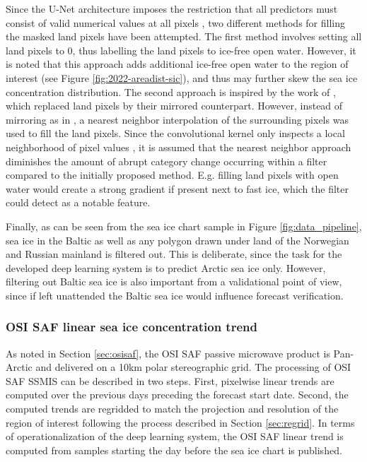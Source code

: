 \documentclass[../main/thesis]{subfiles}
\begin{document}
Since the U-Net architecture imposes the restriction that all predictors must consist of valid numerical values at all pixels \citep{Ronneberger2015}, two different methods for filling the masked land pixels have been attempted. The first method involves setting all land pixels to 0, thus labelling the land pixels to ice-free open water. However, it is noted that this approach adds additional ice-free open water to the region of interest (see Figure \ref{fig:2022-areadist-sic}), and thus may further skew the sea ice concentration distribution. The second approach is inspired by the work of \citet{Wang2017}, which replaced land pixels by their mirrored counterpart. However, instead of mirroring as in \citet{Wang2017}, a nearest neighbor interpolation of the surrounding pixels was used to fill the land pixels. Since the convolutional kernel only inspects a local neighborhood of pixel values \citep{Yamashita2018}, it is assumed that the nearest neighbor approach diminishes the amount of abrupt category change occurring within a filter compared to the initially proposed method. E.g. filling land pixels with open water would create a strong gradient if present next to fast ice, which the filter could detect as a notable feature.

Finally, as can be seen from the sea ice chart sample in Figure \ref{fig:data_pipeline}, sea ice in the Baltic as well as any polygon drawn under land of the Norwegian and Russian mainland is filtered out. This is deliberate, since the task for the developed deep learning system is to predict Arctic sea ice only. However, filtering out Baltic sea ice is also important from a validational point of view, since if left unattended the Baltic sea ice would influence forecast verification. 

\subsubsection{OSI SAF linear sea ice concentration trend}
\label{sec:data_trend}
As noted in Section \ref{sec:osisaf}, the OSI SAF passive microwave product is Pan-Arctic and delivered on a 10km polar stereographic grid. The processing of OSI SAF SSMIS can be described in two steps. First, pixelwise linear trends are computed over the previous days preceding the forecast start date. Second, the computed trends are regridded to match the projection and resolution of the region of interest following the process described in Section \ref{sec:regrid}. In terms of operationalization of the deep learning system, the OSI SAF linear trend is computed from samples starting the day before the sea ice chart is published.
\end{document}
